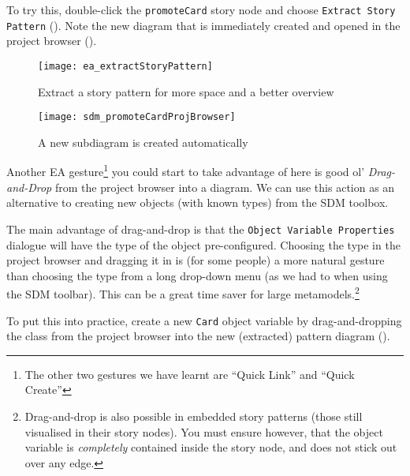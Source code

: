 \begin{stepbystep}

\item To try this, double-click the \texttt{promoteCard} story node and choose \texttt{Ext\-ract Story Pattern}
(). Note the new diagram that is immediately created and opened in the project browser
().

\begin{figure}[htbp]
\begin{center}
  \texttt{[image: ea\_extractStoryPattern]}
  \caption{Extract a story pattern for more space and a better overview}
  \label{ea:sdm_check_extract_storypattern}
\end{center}
\end{figure}

\begin{figure}[htbp]
\begin{center}
  \texttt{[image: sdm\_promoteCardProjBrowser]}
  \caption{A new subdiagram is created automatically}
  \label{ea:sdm_new_sub_diagram}
\end{center}
\end{figure}

\newpage

Another EA gesture\footnote{The other two gestures we have learnt are ``Quick Link'' and ``Quick Create''} you could start to take advantage of here is good
ol' \emph{Drag-and-Drop} from the project browser into a diagram. We can use this action as an alternative to creating new objects (with known types) from
the SDM toolbox.

The main advantage of drag-and-drop is that the \texttt{Object Variable Pro\-per\-ties} dialogue will have the type of the object pre-configured. Choosing
the type in the project browser and dragging it in is (for some people) a more natural gesture than choosing the type from a long drop-down menu (as we had to
when using the SDM toolbar). This can be a great time saver for large metamodels.\footnote{Drag-and-drop is also possible in embedded story patterns
(those still visualised in their story nodes).  You must ensure however, that the object variable is \emph{completely} contained inside the story node, and does
not stick out over any edge.}

\vspace{0.5cm}

\item To put this into practice, create a new \texttt{Card} object variable by drag-and-dropping the class from the project browser
into the new (extracted) pattern diagram ().


\end{stepbystep}
